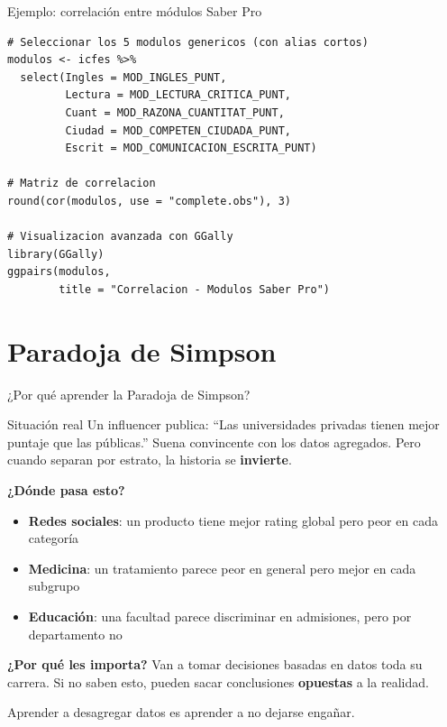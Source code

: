 \documentclass[aspectratio=169, 11pt]{beamer}
\begin{document}
\begin{frame}[fragile]{Ejemplo: correlación entre módulos Saber Pro}
\begin{lstlisting}
# Seleccionar los 5 modulos genericos (con alias cortos)
modulos <- icfes %>%
  select(Ingles = MOD_INGLES_PUNT,
         Lectura = MOD_LECTURA_CRITICA_PUNT,
         Cuant = MOD_RAZONA_CUANTITAT_PUNT,
         Ciudad = MOD_COMPETEN_CIUDADA_PUNT,
         Escrit = MOD_COMUNICACION_ESCRITA_PUNT)

# Matriz de correlacion
round(cor(modulos, use = "complete.obs"), 3)

# Visualizacion avanzada con GGally
library(GGally)
ggpairs(modulos,
        title = "Correlacion - Modulos Saber Pro")
\end{lstlisting}
\end{frame}

\section{Paradoja de Simpson}

\begin{frame}{¿Por qué aprender la Paradoja de Simpson?}
\begin{exampleblock}{Situación real}
Un influencer publica: ``Las universidades privadas tienen mejor puntaje que las p\'ublicas.''
Suena convincente con los datos agregados. Pero cuando separan por estrato, la historia se \textbf{invierte}.
\end{exampleblock}

\small
\textbf{¿D\'onde pasa esto?}
\begin{itemize}\setlength{\itemsep}{1pt}
\item \textbf{Redes sociales}: un producto tiene mejor rating global pero peor en cada categor\'ia
\item \textbf{Medicina}: un tratamiento parece peor en general pero mejor en cada subgrupo
\item \textbf{Educaci\'on}: una facultad parece discriminar en admisiones, pero por departamento no
\end{itemize}

\textbf{¿Por qu\'e les importa?} Van a tomar decisiones basadas en datos toda su carrera.
Si no saben esto, pueden sacar conclusiones \textbf{opuestas} a la realidad.

\vspace{0.2em}
\alert{Aprender a desagregar datos es aprender a no dejarse enga\~nar.}
\end{frame}
\end{document}
